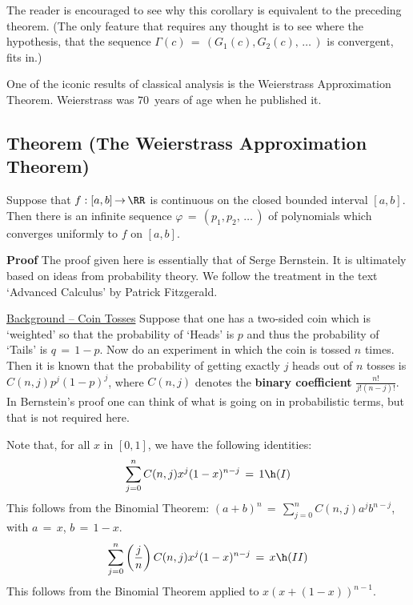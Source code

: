 \V

        The reader is encouraged to see why this corollary is equivalent to the preceding theorem.
    (The only feature that requires any thought is to see where the hypothesis, that the sequence ${\Gamma}(c) \,=\, (G_{1}(c),G_{2}(c),\,{\ldots}\,)$ is convergent, fits in.)


\V
\V
\V


        One of the iconic results of classical analysis is the Weierstrass Approximation Theorem.
    Weierstrass was $70$~years of age when he published it.

\V
\V

             \subsection{\small{\bf Theorem} (The Weierstrass Approximation Theorem)}
            \label{ThmF05.90A}

\V

        Suppose that $f:[a,b] \,{\rightarrow}\, {\RR}$ is continuous on the closed bounded interval $[a,b]$.
    Then there is an infinite sequence ${\varphi} \,=\, (p_{1},p_{2},\,{\ldots}\,)$ of polynomials which converges uniformly to $f$ on $[a,b]$.

\V

        {\bf Proof} The proof given here is essentially that of Serge Bernstein. It is ultimately based on ideas from probability theory.
    We follow the treatment in the text `Advanced Calculus' by Patrick Fitzgerald.

\V

        \underline{Background -- Coin Tosses} Suppose that one has a two-sided coin which is `weighted' so that the probability of `Heads' is $p$ and thus the probability of `Tails' is $q \,=\, 1-p$.
    Now do an experiment in which the coin is tossed $n$ times. Then it is known that the probability of getting exactly $j$ heads out of $n$ tosses is $C(n,j)p^{j}(1-p)^{j}$,
    where $C(n,j)$ denotes the {\bf binary coefficient} ${\displaystyle \frac{n!}{j!(n-j)!}}$.
    In Bernstein's proof one can think of what is going on in probabilistic terms, but that is not required here.

\V

        Note that, for all $x$ in $[0,1]$, we have the following identities:
        \begin{displaymath}
        \sum_{j=0}^{n} C(n,j)x^{j}(1-x)^{n-j} \,=\, 1 \h (I)
        \end{displaymath}
    This follows from the Binomial Theorem: $(a+b)^{n} \,=\, \sum_{j=0}^{n} C(n,j)a^{j}b^{n-j}$, with $a \,=\, x$, $b \,=\, 1-x$.
        \begin{displaymath}
        \sum_{j=0}^{n} \left(\frac{j}{n}\right)C(n,j)x^{j}(1-x)^{n-j} \,=\, x \h (II)
        \end{displaymath}
    This follows from the Binomial Theorem applied to $x(x+(1-x))^{n-1}$.

